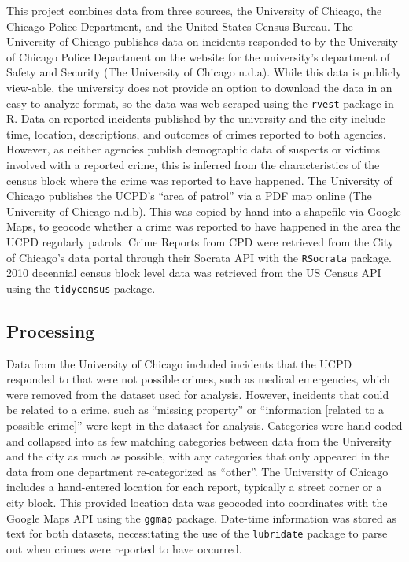 \documentclass{ucetd}
\begin{document}
This project combines data from three sources, the University of
Chicago, the Chicago Police Department, and the United States Census
Bureau. The University of Chicago publishes data on incidents responded
to by the University of Chicago Police Department on the website for the
university's department of Safety and Security (The University of
Chicago n.d.a). While this data is publicly view-able, the university
does not provide an option to download the data in an easy to analyze
format, so the data was web-scraped using the \texttt{rvest} package in
R. Data on reported incidents published by the university and the city
include time, location, descriptions, and outcomes of crimes reported to
both agencies. However, as neither agencies publish demographic data of
suspects or victims involved with a reported crime, this is inferred
from the characteristics of the census block where the crime was
reported to have happened. The University of Chicago publishes the
UCPD's ``area of patrol'' via a PDF map online (The University of
Chicago n.d.b). This was copied by hand into a shapefile via Google
Maps, to geocode whether a crime was reported to have happened in the
area the UCPD regularly patrols. Crime Reports from CPD were retrieved
from the City of Chicago's data portal through their Socrata API with
the \texttt{RSocrata} package. 2010 decennial census block level data
was retrieved from the US Census API using the \texttt{tidycensus}
package.

\hypertarget{processing}{%
\subsection{Processing}\label{processing}}

Data from the University of Chicago included incidents that the UCPD
responded to that were not possible crimes, such as medical emergencies,
which were removed from the dataset used for analysis. However,
incidents that could be related to a crime, such as ``missing property''
or ``information {[}related to a possible crime{]}'' were kept in the
dataset for analysis. Categories were hand-coded and collapsed into as
few matching categories between data from the University and the city as
much as possible, with any categories that only appeared in the data
from one department re-categorized as ``other''. The University of
Chicago includes a hand-entered location for each report, typically a
street corner or a city block. This provided location data was geocoded
into coordinates with the Google Maps API using the \texttt{ggmap}
package. Date-time information was stored as text for both datasets,
necessitating the use of the \texttt{lubridate} package to parse out
when crimes were reported to have occurred.
\end{document}
